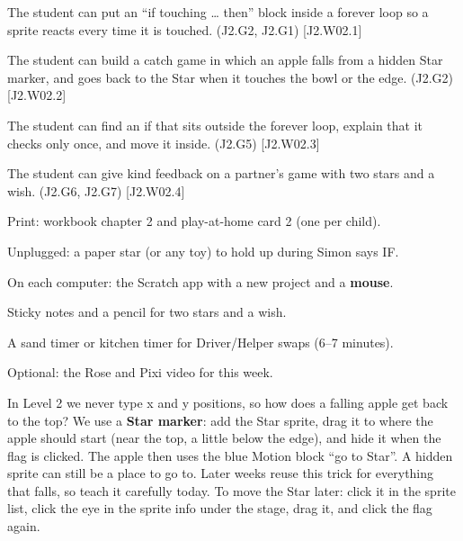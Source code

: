 
\begin{objectives}
  \item The student can put an \enquote{if touching \ldots{} then} block inside a forever loop so a sprite reacts every time it is touched. (J2.G2, J2.G1) [J2.W02.1]
  \item The student can build a catch game in which an apple falls from a hidden Star marker, and goes back to the Star when it touches the bowl or the edge. (J2.G2) [J2.W02.2]
  \item The student can find an if that sits outside the forever loop, explain that it checks only once, and move it inside. (J2.G5) [J2.W02.3]
  \item The student can give kind feedback on a partner's game with two stars and a wish. (J2.G6, J2.G7) [J2.W02.4]
\end{objectives}

\begin{materials}
  \item Print: workbook chapter 2 and play-at-home card 2 (one per child).
  \item Unplugged: a paper star (or any toy) to hold up during Simon says IF.
  \item On each computer: the Scratch app with a new project and a \textbf{mouse}.
  \item Sticky notes and a pencil for two stars and a wish.
  \item A sand timer or kitchen timer for Driver/Helper swaps (6--7 minutes).
  \item Optional: the Rose and Pixi video for this week.
\end{materials}

\begin{teachernote}
In Level 2 we never type x and y positions, so how does a falling apple get back to the top? We use a \textbf{Star marker}: add the Star sprite, drag it to where the apple should start (near the top, a little below the edge), and hide it when the flag is clicked. The apple then uses the blue Motion block \enquote{go to Star}. A hidden sprite can still be a place to go to. Later weeks reuse this trick for everything that falls, so teach it carefully today. To move the Star later: click it in the sprite list, click the  eye in the sprite info under the stage, drag it, and click the flag again.
\end{teachernote}

